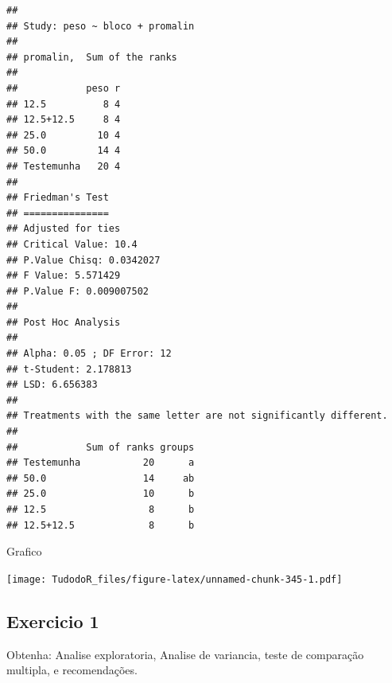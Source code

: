 \documentclass[
]{book}
\newenvironment{Shaded}{\begin{snugshade}}{\end{snugshade}}
\newcommand{\DataTypeTok}[1]{\textcolor[rgb]{0.13,0.29,0.53}{#1}}
\newcommand{\DecValTok}[1]{\textcolor[rgb]{0.00,0.00,0.81}{#1}}
\newcommand{\FloatTok}[1]{\textcolor[rgb]{0.00,0.00,0.81}{#1}}
\newcommand{\KeywordTok}[1]{\textcolor[rgb]{0.13,0.29,0.53}{\textbf{#1}}}
\newcommand{\NormalTok}[1]{#1}
\newcommand{\OperatorTok}[1]{\textcolor[rgb]{0.81,0.36,0.00}{\textbf{#1}}}
\newcommand{\OtherTok}[1]{\textcolor[rgb]{0.56,0.35,0.01}{#1}}
\newcommand{\StringTok}[1]{\textcolor[rgb]{0.31,0.60,0.02}{#1}}
\begin{document}
\begin{verbatim}
## 
## Study: peso ~ bloco + promalin 
## 
## promalin,  Sum of the ranks
## 
##            peso r
## 12.5          8 4
## 12.5+12.5     8 4
## 25.0         10 4
## 50.0         14 4
## Testemunha   20 4
## 
## Friedman's Test
## ===============
## Adjusted for ties
## Critical Value: 10.4
## P.Value Chisq: 0.0342027
## F Value: 5.571429
## P.Value F: 0.009007502 
## 
## Post Hoc Analysis
## 
## Alpha: 0.05 ; DF Error: 12
## t-Student: 2.178813
## LSD: 6.656383 
## 
## Treatments with the same letter are not significantly different.
## 
##            Sum of ranks groups
## Testemunha           20      a
## 50.0                 14     ab
## 25.0                 10      b
## 12.5                  8      b
## 12.5+12.5             8      b
\end{verbatim}

Grafico

\begin{Shaded}
\end{Shaded}

\texttt{[image: TudodoR\_files/figure-latex/unnamed-chunk-345-1.pdf]}

\hypertarget{exercicio-1}{%
\subsection{Exercicio 1}\label{exercicio-1}}

Obtenha: Analise exploratoria, Analise de variancia, teste de comparação multipla, e recomendações.
\end{document}
